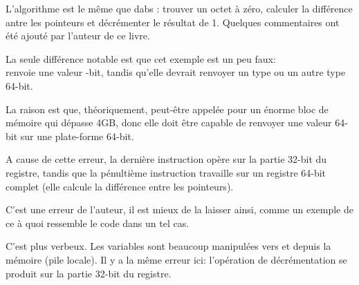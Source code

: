 ﻿




L'algorithme est le même que dabs :
trouver un octet à zéro, calculer la différence antre les pointeurs et décrémenter
le résultat de 1.
Quelques commentaires ont été ajouté par l'auteur de ce livre.

La seule différence notable est que cet exemple est un peu faux: \\
 renvoie une valeur -bit, tandis qu'elle devrait renvoyer
un type  ou un autre type 64-bit.

La raison est que, théoriquement,  peut-être appelée pour un énorme
bloc de mémoire qui dépasse 4GB, donc elle doit être capable de renvoyer une valeur
64-bit sur une plate-forme 64-bit.

A cause de cette erreur, la dernière instruction \SUB opère sur la partie 32-bit
du registre, tandis que la pénultième instruction \SUB travaille sur un registre
64-bit complet (elle calcule la différence entre les pointeurs).

C'est une erreur de l'auteur, il est mieux de la laisser ainsi, comme un exemple
de ce à quoi ressemble le code dans un tel cas.




C'est plus verbeux.
Les variables sont beaucoup manipulées vers et depuis la mémoire (pile locale).
Il y a la même erreur ici: l'opération de décrémentation se produit sur la partie
32-bit du registre.

